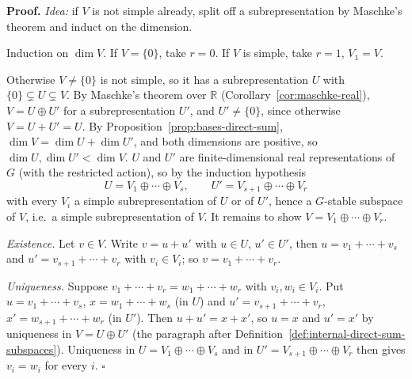 \documentclass[11pt]{report}
\renewenvironment{proof}[1][Proof]{\noindent\textbf{#1.} }{\hfill$\square$\par\vspace{5pt}}
\begin{document}
\begin{proof}
\textit{Idea:} if $V$ is not simple already, split off a subrepresentation by Maschke's theorem and induct on the dimension.\par
Induction on $\dim V$. If $V = \{0\}$, take $r = 0$. If $V$ is simple, take $r = 1$, $V_1 = V$.

Otherwise $V \neq \{0\}$ is not simple, so it has a subrepresentation $U$ with $\{0\} \subsetneq U \subsetneq V$. By Maschke's theorem over $\mathbb{R}$ (Corollary~\ref{cor:maschke-real}), $V = U \oplus U'$ for a subrepresentation $U'$, and $U' \neq \{0\}$, since otherwise $V = U + U' = U$. By Proposition~\ref{prop:bases-direct-sum}, $\dim V = \dim U + \dim U'$, and both dimensions are positive, so $\dim U, \dim U' < \dim V$. $U$ and $U'$ are finite-dimensional real representations of $G$ (with the restricted action), so by the induction hypothesis
\[ U = V_1 \oplus \cdots \oplus V_s, \qquad U' = V_{s+1} \oplus \cdots \oplus V_r \]
with every $V_i$ a simple subrepresentation of $U$ or of $U'$, hence a $G$-stable subspace of $V$, i.e.\ a simple subrepresentation of $V$. It remains to show $V = V_1 \oplus \cdots \oplus V_r$.

\emph{Existence.} Let $v \in V$. Write $v = u + u'$ with $u \in U$, $u' \in U'$, then $u = v_1 + \cdots + v_s$ and $u' = v_{s+1} + \cdots + v_r$ with $v_i \in V_i$; so $v = v_1 + \cdots + v_r$.

\emph{Uniqueness.} Suppose $v_1 + \cdots + v_r = w_1 + \cdots + w_r$ with $v_i, w_i \in V_i$. Put $u = v_1 + \cdots + v_s$, $x = w_1 + \cdots + w_s$ (in $U$) and $u' = v_{s+1} + \cdots + v_r$, $x' = w_{s+1} + \cdots + w_r$ (in $U'$). Then $u + u' = x + x'$, so $u = x$ and $u' = x'$ by uniqueness in $V = U \oplus U'$ (the paragraph after Definition~\ref{def:internal-direct-sum-subspaces}). Uniqueness in $U = V_1 \oplus \cdots \oplus V_s$ and in $U' = V_{s+1} \oplus \cdots \oplus V_r$ then gives $v_i = w_i$ for every $i$.
\end{proof}
\end{document}
